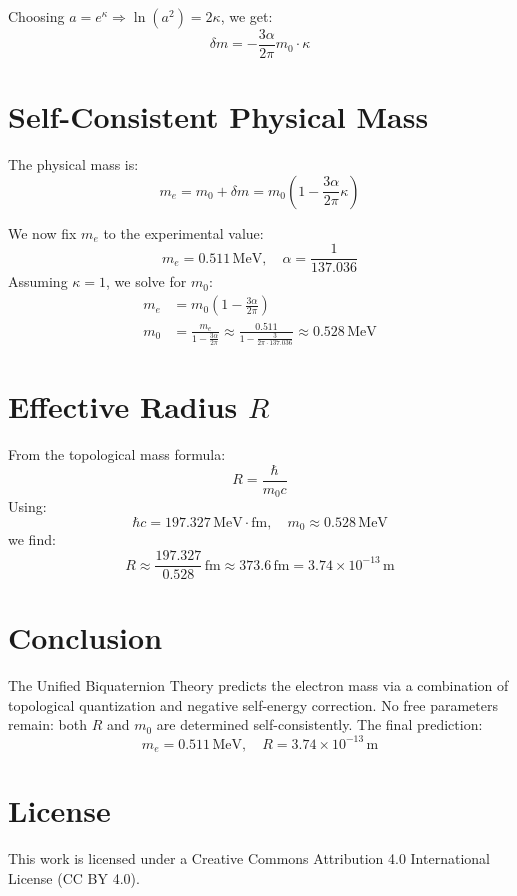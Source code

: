 \documentclass[12pt, a4paper]{article}
\begin{document}
Choosing \( a = e^\kappa \Rightarrow \ln(a^2) = 2\kappa \), we get:
\begin{equation}
    \delta m = -\frac{3\alpha}{2\pi} m_0 \cdot \kappa
\end{equation}

\section{Self-Consistent Physical Mass}

The physical mass is:
\begin{equation}
    m_e = m_0 + \delta m = m_0 \left( 1 - \frac{3\alpha}{2\pi} \kappa \right)
\end{equation}

We now fix \( m_e \) to the experimental value:
\[
m_e = 0.511\,\mathrm{MeV}, \quad \alpha = \frac{1}{137.036}
\]
Assuming \( \kappa = 1 \), we solve for \( m_0 \):
\begin{align*}
    m_e &= m_0 \left( 1 - \frac{3\alpha}{2\pi} \right) \\
    m_0 &= \frac{m_e}{1 - \frac{3\alpha}{2\pi}} \approx \frac{0.511}{1 - \frac{3}{2\pi \cdot 137.036}} \approx 0.528\,\mathrm{MeV}
\end{align*}

\section{Effective Radius \( R \)}

From the topological mass formula:
\begin{equation}
    R = \frac{\hbar}{m_0 c}
\end{equation}
Using:
\[
\hbar c = 197.327\,\mathrm{MeV \cdot fm}, \quad m_0 \approx 0.528\,\mathrm{MeV}
\]
we find:
\begin{equation}
    R \approx \frac{197.327}{0.528} \,\mathrm{fm} \approx 373.6\,\mathrm{fm} = 3.74 \times 10^{-13} \,\mathrm{m}
\end{equation}

\section{Conclusion}

The Unified Biquaternion Theory predicts the electron mass via a combination of topological quantization and negative self-energy correction. No free parameters remain: both \( R \) and \( m_0 \) are determined self-consistently. The final prediction:
\[
\boxed{
m_e = 0.511\,\mathrm{MeV}, \quad R = 3.74 \times 10^{-13}\,\mathrm{m}
}
\]


\section*{License}
This work is licensed under a Creative Commons Attribution 4.0 International License (CC BY 4.0).
\end{document}
